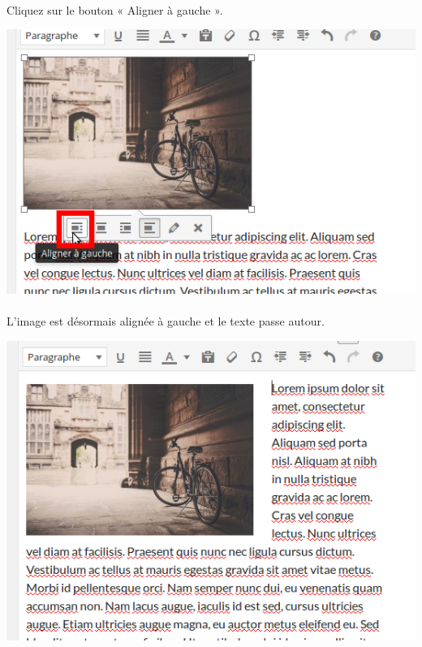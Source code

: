 \documentclass[10pt,a4paper]{article}
\begin{document}
\paragraph{}Cliquez sur le bouton « Aligner à gauche ».
\begin{center}
\includegraphics[scale=0.3]{img/0110.png}
\end{center}
\paragraph{}L'image est désormais alignée à gauche et le texte passe autour.
\begin{center}
\includegraphics[scale=0.3]{img/0111.png}
\end{center}
\end{document}
